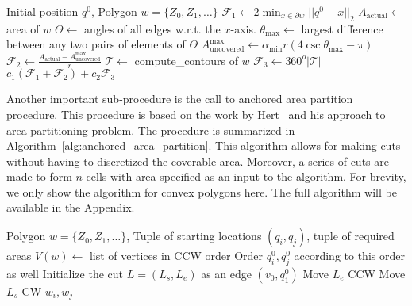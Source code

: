 \documentclass[../main.tex]{subfiles}
\begin{document}
\begin{algorithm}
	\caption{$\text{compute\_}\chi(q^0, w)$}
	\label{alg:metric_algorithm}
	\begin{algorithmic}[1]
		\REQUIRE Initial position $q^0$, Polygon $w=\{Z_0,Z_1,\ldots\}$ 
		\STATE $\mathcal{F}_1\gets2\min_{x\in\partial w}||q^0-x||_2$
		\STATE $A_\text{actual}\gets$ area of $w$
		\STATE $\Theta\gets$ angles of all edges w.r.t. the $x$-axis.
		\STATE $\theta_{\max}\gets$ largest difference between any two pairs of elements of $\Theta$
		\STATE $A^{\max}_{\text{uncovered}}\gets\alpha_{\min}r(4\csc{\theta_{\max}}-\pi)$
		\STATE $\mathcal{F}_2\gets\frac{A_\text{actual}-A^{\max}_{\text{uncovered}}}{r}$
		\STATE $\mathcal{T}\gets$ compute\_contours of $w$
		\STATE $\mathcal{F}_3\gets360^o|\mathcal{T}|$
		\RETURN $c_1(\mathcal{F}_1+\mathcal{F}_2)+c_2\mathcal{F}_3$
	\end{algorithmic}
\end{algorithm}

Another important sub-procedure is the call to anchored area partition procedure. This procedure is based on the work by Hert~\cite{hert1998polygon} and his approach to area partitioning problem. The procedure is summarized in Algorithm~\ref{alg:anchored_area_partition}. This algorithm allows for making cuts without having to discretized the coverable area. Moreover, a series of cuts are made to form $n$ cells with area specified as an input to the algorithm. For brevity, we only show the algorithm for convex polygons here. The full algorithm will be available in the Appendix.

\begin{algorithm}
	\caption{$\text{anchored\_area\_partition}(w, (q^0_i,q^0_j), A_1,A_2)$}
	\label{alg:anchored_area_partition}
	\begin{algorithmic}[1]
		\REQUIRE Polygon $w=\{Z_0,Z_1,\ldots\}$, Tuple of starting locations $(q_i,q_j)$, tuple of required areas
		\STATE $V(w)\gets$ list of vertices in CCW order
		\STATE Order $q^0_i,q^0_j$ according to this order as well
		\STATE Initialize the cut $L=(L_s,L_e)$ as an edge $(v_0,q^0_1)$
			\STATE Move $L_e$ CCW
		\ENDWHILE
				\STATE Move $L_s$ CW
			\ENDWHILE
		\ENDIF
		\RETURN $w_i,w_j$
	\end{algorithmic}
\end{algorithm}
\end{document}
